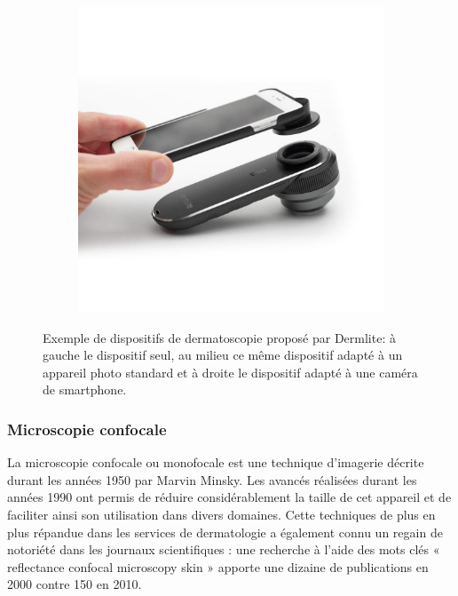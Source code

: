 \begin{figure}
\begin{subfigure}{.33\textwidth}
    \end{subfigure}
    \begin{subfigure}{.33\textwidth}
      \centering
      \includegraphics[width=\linewidth]{contents/chapter_2/resources/dermatoscope_example_3.png}
    \end{subfigure}
    \caption{Exemple de dispositifs de dermatoscopie proposé par Dermlite: à gauche le dispositif seul, au milieu ce même dispositif adapté à un appareil photo standard et à droite le dispositif adapté à une caméra de smartphone.}
    \label{fig:dermatoscope_example}
\end{figure}\par

\subsubsection{Microscopie confocale}
La microscopie confocale ou monofocale est une technique d’imagerie décrite durant les années 1950 par Marvin Minsky. Les avancés réalisées durant les années 1990 ont permis de réduire considérablement la taille de cet appareil et de faciliter ainsi son utilisation dans divers domaines. Cette techniques de plus en plus répandue dans les services de dermatologie a également connu un regain de notoriété dans les journaux scientifiques : une recherche à l’aide des mots clés « reflectance confocal microscopy skin » apporte une dizaine de publications en 2000 contre 150 en 2010.\par
 
